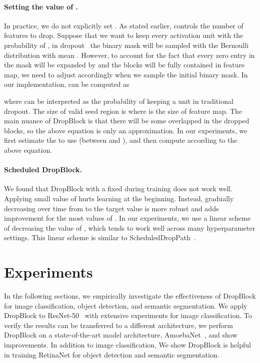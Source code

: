 \documentclass{article}
\begin{document}
\paragraph{Setting the value of .} In practice, we do not explicitly set . As stated earlier,  controls the number of features to drop. Suppose that we want to keep every activation unit with the probability of , in dropout~\cite{dropout2014} the binary mask will be sampled with the Bernoulli distribution with mean . However, to account for the fact that every zero entry in the mask will be expanded by  and the blocks will be fully contained in feature map, we need to adjust  accordingly when we sample the initial binary mask. In our implementation,  can be computed as



where  can be interpreted as the probability of keeping a unit in traditional dropout. The size of valid seed region is  where  is the size of feature map. The main nuance of DropBlock is that there will be some overlapped in the dropped blocks, so the above equation is only an approximation. In our experiments, we first estimate the  to use (between  and ), and then compute  according to the above equation.

\paragraph{Scheduled DropBlock.} We found that DropBlock with a fixed  during training does not work well. Applying small value of  hurts learning at the beginning. Instead, gradually decreasing  over time from  to the target value is more robust and adds improvement for the most values of . In our experiments, we use a linear scheme of decreasing the value of , which tends to work well across many hyperparameter settings. This linear scheme is similar to ScheduledDropPath~\cite{zoph2017learning}.



\section{Experiments}
In the following sections, we empirically investigate the effectiveness of DropBlock for image classification, object detection, and semantic segmentation. We apply DropBlock to ResNet-50~\cite{he2016deep} with extensive experiments for image classification. To verify the results can be transferred to a different architecture, we perform DropBlock on a state-of-the-art model architecture, AmoebaNet~\cite{real2018regularized}, and show improvements. In addition to image classification, We show DropBlock is helpful in training RetinaNet \cite{lin2017focalloss} for object detection and semantic segmentation.
\end{document}

